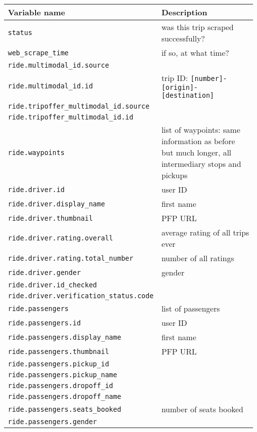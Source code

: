 \documentclass[11pt,a4paper]{article}
\begin{document}
\begin{longtable}{p{}p{}}
	\textbf{Variable name}							& \textbf{Description} \\\hline\hline
	\verb|status|									& was this trip scraped successfully?		\\
	\verb|web_scrape_time|							& if so, at what time?						\\\hline
	\verb|ride.multimodal_id.source|				& 		\\
	\verb|ride.multimodal_id.id|					& trip ID: \verb|[number]-[origin]-[destination]|		\\
	\verb|ride.tripoffer_multimodal_id.source|		& 		\\
	\verb|ride.tripoffer_multimodal_id.id|			& 		\\\hline
	\verb|ride.waypoints|							& list of waypoints: same information as before but much longer, all intermediary stops and pickups		\\\hline
	\verb|ride.driver.id|							& user ID		\\
	\verb|ride.driver.display_name|					& first name		\\
	\verb|ride.driver.thumbnail|					& PFP URL		\\
	\verb|ride.driver.rating.overall|				& average rating of all trips ever		\\
	\verb|ride.driver.rating.total_number|			& number of all ratings		\\
	\verb|ride.driver.gender|						& gender		\\
	\verb|ride.driver.id_checked|					& 		\\
	\verb|ride.driver.verification_status.code|		& 		\\\hline
	\verb|ride.passengers|							& list of passengers 		\\
	\verb|ride.passengers.id|						& user ID 		\\
	\verb|ride.passengers.display_name|				& first name 		\\
	\verb|ride.passengers.thumbnail|				& PFP URL 		\\
	\verb|ride.passengers.pickup_id|				&  		\\
	\verb|ride.passengers.pickup_name|				&  		\\
	\verb|ride.passengers.dropoff_id|				&  		\\
	\verb|ride.passengers.dropoff_name|				&  		\\
	\verb|ride.passengers.seats_booked|				& number of seats booked 		\\
	\verb|ride.passengers.gender|					&  		\\

\end{longtable}
\end{document}
